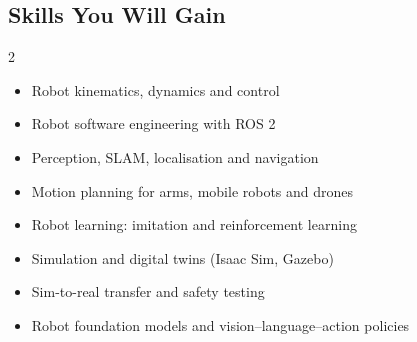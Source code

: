 \documentclass[10pt,a4paper]{article}
\begin{document}
\subsection*{Skills You Will Gain}\begin{multicols}{2}\begin{itemize}\small
\item Robot kinematics, dynamics and control
\item Robot software engineering with ROS 2
\item Perception, SLAM, localisation and navigation
\item Motion planning for arms, mobile robots and drones
\item Robot learning: imitation and reinforcement learning
\item Simulation and digital twins (Isaac Sim, Gazebo)
\item Sim-to-real transfer and safety testing
\item Robot foundation models and vision–language–action policies
\end{itemize}\end{multicols}
\end{document}
